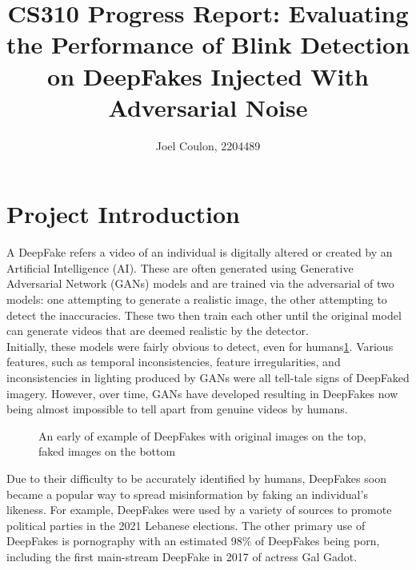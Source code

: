 \documentclass{article}
\title{CS310 Progress Report: Evaluating the Performance of Blink Detection on DeepFakes Injected With Adversarial Noise}
\author{Joel Coulon, 2204489}
\date{}
\begin{document}
\maketitle

\section{Project Introduction}

A DeepFake refers a video of an individual is digitally altered or created by an Artificial Intelligence (AI). These are often generated using Generative Adversarial Network (GANs) models and are trained via the adversarial of two models: one attempting to generate a realistic image, the other attempting to detect the inaccuracies. These two then train each other until the original model can generate videos that are deemed realistic by the detector.\\

Initially, these models were fairly obvious to detect, even for humans\ref{fig:earlyexample}. Various features, such as temporal inconsistencies, feature irregularities, and inconsistencies in lighting produced by GANs were all tell-tale signs of DeepFaked imagery. However, over time, GANs have developed resulting in DeepFakes now being almost impossible to tell apart from genuine videos by humans.

\begin{figure}[H]
    \centering
    \caption{An early of example of DeepFakes with original images on the top, faked images on the bottom\cite{earlydeepfakeimage}}
    \label{fig:earlyexample}
\end{figure}

Due to their difficulty to be accurately identified by humans, DeepFakes soon became a popular way to spread misinformation by faking an individual's likeness. For example, DeepFakes were used by a variety of sources to promote political parties in the 2021 Lebanese elections\cite{misinformation}. The other primary use of DeepFakes is pornography with an estimated 98\% of DeepFakes being porn\cite{pornography}, including the first main-stream DeepFake in 2017 of actress Gal Gadot\cite{misinformation}.\\
\end{document}

